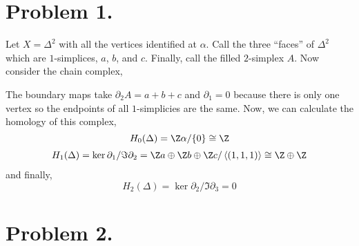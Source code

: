 \documentclass[12pt]{extarticle}
\begin{document}
 
\section*{Problem 1.}

\begin{center} 
\end{center}

Let $X = \Delta^2$ with all the vertices identified at $\alpha$. Call the three ``faces'' of $\Delta^2$ which are $1$-simplices, $a$, $b$, and $c$. Finally, call the filled $2$-simplex $A$. Now consider the chain complex,
\begin{center}
\end{center}
The boundary maps take $\partial_2 A = a + b + c$ and $\partial_1 = 0$ because there is only one vertex so the endpoints of all $1$-simplicies are the same. Now, we can calculate the homology of this complex,
\[ H_0(\Delta) = \Z \alpha / \{0\} \cong \Z \]
\begin{align*} 
H_1(\Delta) = \ker{\partial_1}/\Im{\partial_2} =   \Z a \oplus \Z b \oplus \Z c / \left< (1, 1, 1)\right> \cong \Z \oplus \Z
\end{align*}
and finally,
\[ H_2(\Delta) = \ker{\partial_2} / \Im{\partial_3} = 0 \]

\section*{Problem 2.}
\end{document}
